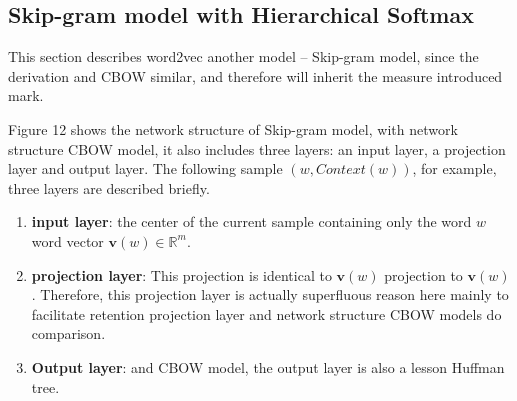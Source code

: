 \subsection{Skip-gram model with Hierarchical Softmax}
This section describes word2vec another model -- Skip-gram model, since the derivation and CBOW similar, and therefore will inherit the measure introduced mark.

Figure 12 shows the network structure of Skip-gram model, with network structure CBOW model, it also includes three layers: an input layer, a projection layer and output layer. The following sample $(w,Context(w))$, for example, three layers are described briefly.
\begin{enumerate}
\item \textbf{input layer}: the center of the current sample containing only the word $w$ word vector $\mathbf{v}(w)\in\mathbb{R}^m$.
\item \textbf{projection layer}: This projection is identical to $\mathbf{v}(w)$ projection to $\mathbf{v}(w)$. Therefore, this projection layer is actually superfluous reason here mainly to facilitate retention projection layer and network structure CBOW models do comparison.
\item \textbf{Output layer}: and CBOW model, the output layer is also a lesson Huffman tree.
\end{enumerate}
